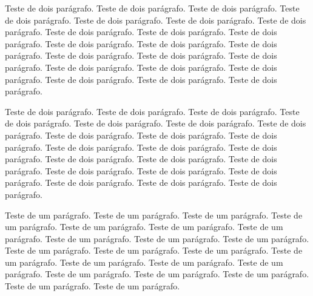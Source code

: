 \documentclass[12pt]{article}
\begin{document}
Teste de dois parágrafo. Teste de dois parágrafo. Teste de dois parágrafo. Teste de dois parágrafo. Teste de dois parágrafo. Teste de dois parágrafo. Teste de dois parágrafo. Teste de dois parágrafo. Teste de dois parágrafo. Teste de dois parágrafo. Teste de dois parágrafo. Teste de dois parágrafo. Teste de dois parágrafo. Teste de dois parágrafo. Teste de dois parágrafo. Teste de dois parágrafo. Teste de dois parágrafo. Teste de dois parágrafo. Teste de dois parágrafo. Teste de dois parágrafo. Teste de dois parágrafo. Teste de dois parágrafo.


Teste de dois parágrafo. Teste de dois parágrafo. Teste de dois parágrafo. Teste de dois parágrafo. Teste de dois parágrafo. Teste de dois parágrafo. Teste de dois parágrafo. Teste de dois parágrafo. Teste de dois parágrafo. Teste de dois parágrafo. Teste de dois parágrafo. Teste de dois parágrafo. Teste de dois parágrafo. Teste de dois parágrafo. Teste de dois parágrafo. Teste de dois parágrafo. Teste de dois parágrafo. Teste de dois parágrafo. Teste de dois parágrafo. Teste de dois parágrafo. Teste de dois parágrafo. Teste de dois parágrafo.

Teste de um parágrafo. Teste de um parágrafo. Teste de um parágrafo. Teste de um parágrafo. Teste de um parágrafo. Teste de um parágrafo. Teste de um parágrafo. Teste de um parágrafo. Teste de um parágrafo. Teste de um parágrafo. Teste de um parágrafo. Teste de um parágrafo. Teste de um parágrafo. Teste de um parágrafo. Teste de um parágrafo. Teste de um parágrafo. Teste de um parágrafo. Teste de um parágrafo. Teste de um parágrafo. Teste de um parágrafo. Teste de um parágrafo. Teste de um parágrafo.
\end{document}
